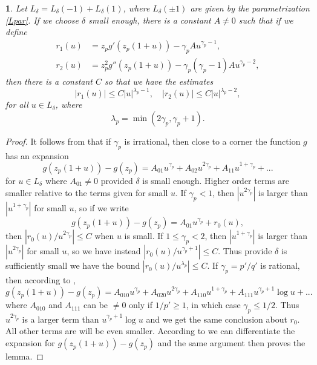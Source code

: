 \documentclass{article}
\numberwithin{equation}{section}
\numberwithin{figure}{section}
\theoremstyle{plain}
\theoremstyle{plain}
\newtheorem{lemma}[thm]{\protect\lemmaname}
\numberwithin{thm}{section}
\theoremstyle{remark}
\providecommand{\lemmaname}{Lemma}
\let \le \leqslant
\let \ge \geqslant
\begin{document}
\begin{lemma}\label{Lem:regularity}
Let $L_\delta=L_\delta(-1)+L_\delta(1)$, where $L_\delta(\pm 1)$ are given by the parametrization \eqref{Lpar}. If we choose $\delta$ small enough, there is a constant
$A\neq 0$ such that if we define
\begin{align}
r_1(u)&=z_pg'(z_p(1+u))-\gamma_pAu^{\gamma_p-1},\label{r1u}\\
r_2(u)&=z_p^2g''(z_p(1+u))-\gamma_p(\gamma_p-1)Au^{\gamma_p-2},\label{r2u}
\end{align}
then there is a constant $C$ so that we have the estimates
\begin{equation}\label{r12est}
|r_1(u)|\le C|u|^{\lambda_p-1},\quad  |r_2(u)|\le C|u|^{\lambda_p-2},
\end{equation}
for all $u\in L_\delta$, where
\begin{equation}\label{lambdap}
\lambda_p=\min(2\gamma_p,\gamma_p+1).
\end{equation}
\end{lemma}

\begin{proof}
It follows from \cite{Leh} that if $\gamma_p$ is irrational, then close to a corner the function $g$ has an expansion
\begin{equation*}
g(z_p(1+u))-g(z_p)=A_{01}u^{\gamma_p}+A_{02}u^{2\gamma_p}+A_{11}u^{1+\gamma_p}+...
\end{equation*}
for $u\in L_{\delta}$ where $A_{01}\neq 0$ provided $\delta$ is small enough. Higher order terms are smaller relative to the terms given for small $u$. If
$\gamma_p< 1$, then $|u^{2\gamma_p}|$ is larger than $|u^{1+\gamma_p}|$ for small $u$, so if we write
\begin{equation*}
g(z_p(1+u))-g(z_p)=A_{01}u^{\gamma_p}+r_0(u),
\end{equation*}
then $|r_0(u)/u^{2\gamma_p}|\le C$ when $u$ is small. If $1\le \gamma_p<2$, then $|u^{1+\gamma_p}|$ is larger than $|u^{2\gamma_p}|$ for small $u$, so we have instead
$|r_0(u)/u^{\gamma_p+1}|\le C$. Thus provide $\delta$ is sufficiently small we have the bound $|r_0(u)/u^{\lambda_p}|\le C$. If $\gamma_p=p'/q'$ is rational, then according to 
\cite{Leh},
\begin{equation}\label{psirat}
g(z_p(1+u))-g(z_p)=A_{010}u^{\gamma_p}+A_{020}u^{2\gamma_p}+A_{110}u^{1+\gamma_p}+A_{111}u^{\gamma_p+1}\log u+...
\end{equation}
where $A_{010}$ and $A_{111}$ can be $\neq 0$ only if $1/p'\ge 1$, in which case $\gamma_p\le 1/2$. Thus $u^{2\gamma_p}$ is a larger term than
$u^{\gamma_p+1}\log u$ and we get the same conclusion about $r_0$. All other terms are will be even smaller. According to \cite{Leh} we can differentiate the
expansion for $g(z_p(1+u))-g(z_p)$ and the same argument then proves the lemma.
\end{proof}
\end{document}

